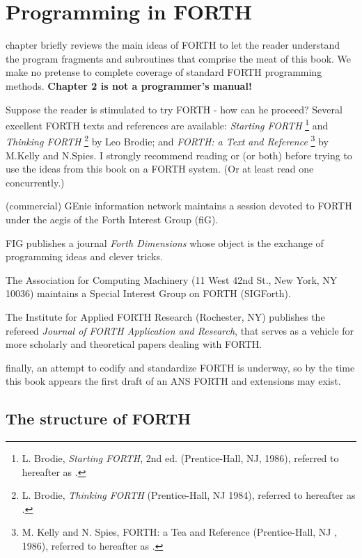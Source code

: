 ﻿\chapter{Programming in FORTH}
\startcontents[chapters]

 chapter briefly reviews the main ideas of FORTH to let the reader understand the program fragments and subroutines that comprise the meat of this book. We make no pretense to complete coverage of standard FORTH programming methods. \textbf{Chapter 2 is not a programmer’s manual!}

Suppose the reader is stimulated to try FORTH - how can he proceed? Several excellent FORTH texts and references are available: \textit{Starting FORTH} \footnote{L. Brodie, \textit{Starting FORTH}, 2nd ed. (Prentice-Hall, NJ, 1986), referred to hereafter as \SF.} and \textit{Thinking FORTH} \footnote{L. Brodie, \textit{Thinking FORTH} (Prentice-Hall, NJ 1984), referred to hereafter as \TF.} by Leo Brodie; and \textit{ FORTH: a Text and Reference} \footnote{M. Kelly and N. Spies, FORTH: a Tea and Reference (Prentice-Hall, NJ , 1986), referred to hereafter as \FTR.} by M.Kelly and N.Spies. I strongly recommend reading \FTR or \SF (or both) before trying to use the ideas from this book on a FORTH system. (Or at least read one concurrently.)

 (commercial) GEnie information network maintains a session devoted to FORTH under the aegis of the Forth Interest Group (fiG).

FIG publishes a journal \textit{Forth Dimensions} whose object is the exchange of programming ideas and clever tricks.

The Association for Computing Machinery (11 West 42nd St., New York, NY 10036) maintains a Special Interest Group on FORTH (SIGForth).

The Institute for Applied FORTH Research (Rochester, NY) publishes the refereed \textit{Journal of FORTH Application and Research}, that serves as a vehicle for more scholarly and theoretical papers dealing with FORTH.

finally, an attempt to codify and standardize FORTH is underway, so by the time this book appears the first draft of an ANS FORTH and extensions may exist.

\section{The structure of FORTH}

